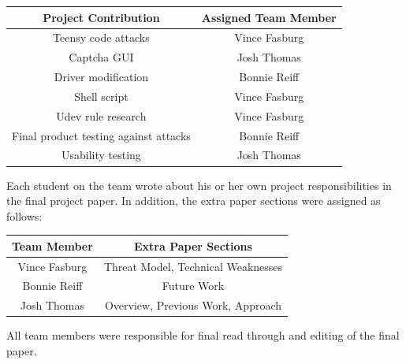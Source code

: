 \documentclass[pagenumbers]{ieee}
\begin{document}
\begin{center}
	\begin{tabular}{ | c | c | }
		\hline \textbf{Project Contribution} & \textbf{Assigned Team Member} \\ \hline
		Teensy code attacks & Vince Fasburg \\ \hline
		Captcha GUI & Josh Thomas \\ \hline
		Driver modification & Bonnie Reiff \\ \hline
		Shell script & Vince Fasburg \\ \hline
		Udev rule research & Vince Fasburg \\ \hline
		Final product testing against attacks & Bonnie Reiff \\ \hline
		Usability testing & Josh Thomas \\ \hline
	\end{tabular}
\end{center}

Each student on the team wrote about his or her own project responsibilities in the final project paper. In addition, the extra paper sections were assigned as follows:

\begin{center}
	\begin{tabular}{ | c | c | }
		\hline \textbf{Team Member} & \textbf{Extra Paper Sections} \\ \hline
		Vince Fasburg & Threat Model, Technical Weaknesses \\ \hline
		Bonnie Reiff &  Future Work \\ \hline
		Josh Thomas & Overview, Previous Work, Approach  \\ \hline
	\end{tabular}
\end{center}

 All team members were responsible for final read through and editing of the final paper.




\end{document}
